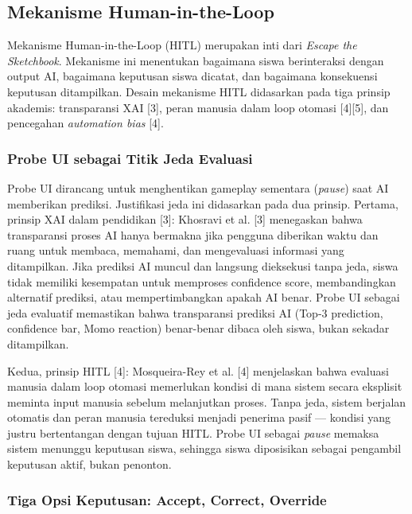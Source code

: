 \subsection{Mekanisme Human-in-the-Loop}
\label{subsec:mekanisme-hitl}

Mekanisme Human-in-the-Loop (HITL) merupakan inti dari \textit{Escape the Sketchbook}. Mekanisme ini menentukan bagaimana siswa berinteraksi dengan output AI, bagaimana keputusan siswa dicatat, dan bagaimana konsekuensi keputusan ditampilkan. Desain mekanisme HITL didasarkan pada tiga prinsip akademis: transparansi XAI [3], peran manusia dalam loop otomasi [4][5], dan pencegahan \textit{automation bias} [4].

\subsubsection{Probe UI sebagai Titik Jeda Evaluasi}

Probe UI dirancang untuk menghentikan gameplay sementara (\textit{pause}) saat AI memberikan prediksi. Justifikasi jeda ini didasarkan pada dua prinsip. Pertama, prinsip XAI dalam pendidikan [3]: Khosravi et al. [3] menegaskan bahwa transparansi proses AI hanya bermakna jika pengguna diberikan waktu dan ruang untuk membaca, memahami, dan mengevaluasi informasi yang ditampilkan. Jika prediksi AI muncul dan langsung dieksekusi tanpa jeda, siswa tidak memiliki kesempatan untuk memproses confidence score, membandingkan alternatif prediksi, atau mempertimbangkan apakah AI benar. Probe UI sebagai jeda evaluatif memastikan bahwa transparansi prediksi AI (Top-3 prediction, confidence bar, Momo reaction) benar-benar dibaca oleh siswa, bukan sekadar ditampilkan.

Kedua, prinsip HITL [4]: Mosqueira-Rey et al. [4] menjelaskan bahwa evaluasi manusia dalam loop otomasi memerlukan kondisi di mana sistem secara eksplisit meminta input manusia sebelum melanjutkan proses. Tanpa jeda, sistem berjalan otomatis dan peran manusia tereduksi menjadi penerima pasif --- kondisi yang justru bertentangan dengan tujuan HITL. Probe UI sebagai \textit{pause} memaksa sistem menunggu keputusan siswa, sehingga siswa diposisikan sebagai pengambil keputusan aktif, bukan penonton.

\subsubsection{Tiga Opsi Keputusan: Accept, Correct, Override}

